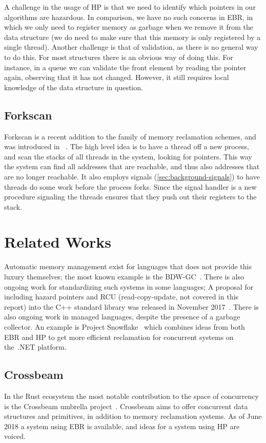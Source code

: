 A challenge in the usage of HP is that we need to identify which pointers in our algorithms are
hazardous. In comparison, we have no such concerns in EBR, in which we only need to register memory
as garbage when we remove it from the data structure (we do need to make sure that this memory is
only registered by a single thread). Another challenge is that of validation, as there is no
general way to do this. For most structures there is an obvious way of doing this. For instance, in
a queue we can validate the front element by reading the  pointer again, observing that
it has not changed. However, it still requires local knowledge of the data structure in question.


\subsection{Forkscan\label{sec:forkscan}}

Forkscan is a recent addition to the family of memory reclamation schemes, and was introduced in
~\cite{alistarh2017forkscan}. The high level idea is to have a thread  off a new
process, and scan the stacks of all threads in the system, looking for pointers. This way the
system can find all addresses that are reachable, and thus also addresses that are no longer
reachable. It also employs signals (\cref{sec:background-signals}) to have threads do some work
before the process forks. Since the signal handler is a new procedure signaling the threads ensures
that they push out their registers to the stack.


\section{Related Works\label{sec:background-related}}

Automatic memory management exist for languages that does not provide this luxury themselves; the
most known example is the BDW-GC~\cite{bdwgc}.  There is also ongoing work for standardizing such
systems in some languages; A proposal for including hazard pointers and RCU (read-copy-update, not
covered in this report) into the C++ standard library was released in November 2017~\cite{cpp:mr}.
There is also ongoing work in managed languages, despite the presence of a garbage collector. An
example is Project
Snowflake~\cite{project-snowflake-non-blocking-safe-manual-memory-management-net} which combines
ideas from both EBR and HP to get more efficient reclamation for concurrent systems on the\ .NET
platform.


\subsection{Crossbeam}

In the Rust ecosystem the most notable contribution to the space of concurrency is the Crossbeam
umbrella project~\cite{crossbeam}. Crossbeam aims to offer concurrent data structures and
primitives, in addition to memory reclamation systems. As of June 2018 a system using EBR is
available, and ideas for a system using HP are voiced.
